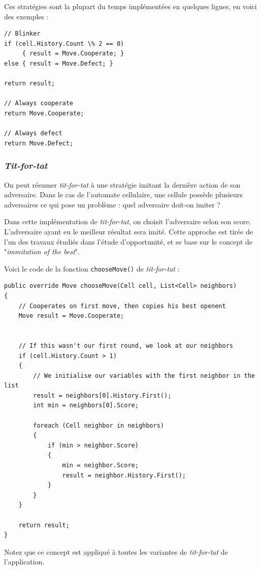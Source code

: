 \documentclass[a4paper, french]{article}
\begin{document}
Ces stratégies sont la plupart du temps implémentées en quelques lignes, en voici des exemples :

\begin{lstlisting}
// Blinker
if (cell.History.Count \% 2 == 0)
     { result = Move.Cooperate; }
else { result = Move.Defect; }

return result;

// Always cooperate
return Move.Cooperate;

// Always defect
return Move.Defect;
\end{lstlisting}

\subsubsection{\textit{Tit-for-tat}}
On peut résumer \textit{tit-for-tat} à une stratégie imitant la dernière action de son adversaire. Dans le cas de l'automate cellulaire, une cellule possède plusieurs adversaires ce qui pose un problème : quel adversaire doit-on imiter ?

Dans cette implémentation de \textit{tit-for-tat}, on choisit l'adversaire selon son score. L'adversaire ayant eu le meilleur résultat sera imité. Cette approche est tirée de l'un des travaux étudiés dans l'étude d'opportunité, et se base sur le concept de "\textit{immitation of the best}".

Voici le code de la fonction \texttt{chooseMove()} de \textit{tit-for-tat} :

\begin{lstlisting}
public override Move chooseMove(Cell cell, List<Cell> neighbors)
{
    // Cooperates on first move, then copies his best openent
    Move result = Move.Cooperate;


    // If this wasn't our first round, we look at our neighbors
    if (cell.History.Count > 1)
    {
        // We initialise our variables with the first neighbor in the list
        result = neighbors[0].History.First();
        int min = neighbors[0].Score;

        foreach (Cell neighbor in neighbors)
        {
            if (min > neighbor.Score)
            {
                min = neighbor.Score;
                result = neighbor.History.First();
            }
        }
    }

    return result;
}
\end{lstlisting}

Notez que ce concept est appliqué à toutes les variantes de \textit{tit-for-tat} de l'application.
\end{document}
